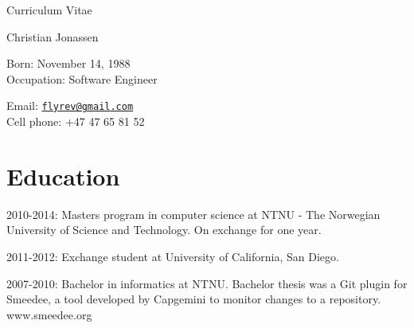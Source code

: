 \documentclass[letterpaper]{article}
\def\name{Christian Jonassen}
\renewenvironment{itemize}{
  \begin{list}{}{
    \setlength{\leftmargin}{1.5em}
  }
}{
  \end{list}
}
\begin{document}

\centerline{\LARGE Curriculum Vitae}

\centerline{}

\centerline{\huge \name}

\vspace{0.25in}

\begin{minipage}[t]{0.5\textwidth}
  Born: November 14, 1988 \\
  Occupation: Software Engineer
\end{minipage}
\begin{minipage}[t]{0.5\textwidth}
  Email: \href{mailto:flyrev@gmail.com}{\tt flyrev@gmail.com} \\
  Cell phone: +47 47 65 81 52
\end{minipage}

\section*{Education}

\begin{itemize}
  \item 2010-2014: Masters program in computer science at NTNU - The Norwegian University of Science and Technology. On exchange for one year.
    \item 2011-2012: Exchange student at University of California, San Diego.


  \item 2007-2010: Bachelor in informatics at NTNU. Bachelor thesis
    was a Git plugin for Smeedee, a tool developed by Capgemini to
    monitor changes to a repository. www.smeedee.org
\end{itemize}
\end{document}
